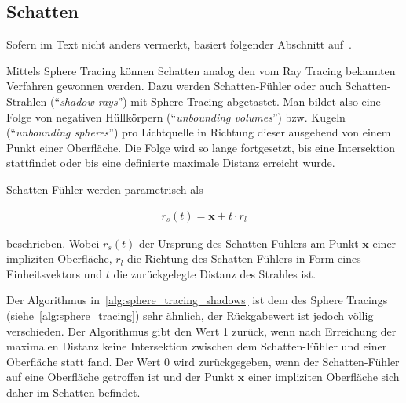 
\subsection{Schatten}
\label{sec:rendering_implicit_surfaces_shadows}

Sofern im Text nicht anders vermerkt, basiert folgender Abschnitt
auf~\cite[S. 7]{reiner_smi_2011}.

Mittels Sphere Tracing können Schatten analog den vom Ray Tracing
bekannten Verfahren gewonnen werden. Dazu werden Schatten-Fühler oder
auch Schatten-Strahlen (``\textit{shadow rays}'') mit Sphere Tracing
abgetastet.  Man bildet also eine Folge von negativen Hüllkörpern
(``\textit{unbounding volumes}'') bzw. Kugeln (``\textit{unbounding
    spheres}'') pro Lichtquelle in Richtung dieser ausgehend von einem
Punkt einer Oberfläche. Die Folge wird so lange fortgesetzt, bis eine
Intersektion stattfindet oder bis eine definierte maximale Distanz
erreicht wurde.

Schatten-Fühler werden parametrisch als

\begin{gather}
    r_{s}(t) = \bm{x} + t \cdot r_{l}
\end{gather}

beschrieben. Wobei $r_{s}(t)$ der Ursprung des Schatten-Fühlers am Punkt $\bm{x}$
einer impliziten Oberfläche, $r_{l}$ die Richtung des Schatten-Fühlers
in Form eines Einheitsvektors und $t$ die zurückgelegte Distanz des
Strahles ist.

Der Algorithmus in~\autoref{alg:sphere_tracing_shadows} ist dem des
Sphere Tracings (siehe~\autoref{alg:sphere_tracing}) sehr ähnlich, der
Rückgabewert ist jedoch völlig verschieden. Der Algorithmus gibt den
Wert 1 zurück, wenn nach Erreichung der maximalen Distanz keine
Intersektion zwischen dem Schatten-Fühler und einer Oberfläche statt
fand.  Der Wert 0 wird zurückgegeben, wenn der Schatten-Fühler auf eine
Oberfläche getroffen ist und der Punkt $\bm{x}$ einer impliziten
Oberfläche sich daher im Schatten befindet.

